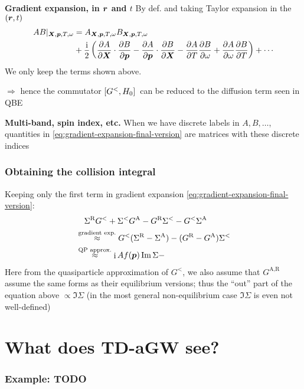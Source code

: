 \documentclass[t]{beamer}
\DeclareMathOperator{\ii}{i}
\begin{document}
\begin{frame}[allowframebreaks]
\textbf{Gradient expansion, in $\vb*{r}$ and $t$} 
By def. and taking Taylor expansion in the $(\vb*{r}, t)$
\begin{equation}
    \begin{aligned}
        AB|_{\vb*{X}, \vb*{p}, T, \omega} &= A_{\vb*{X}, \vb*{p}, T, \omega} B_{\vb*{X}, \vb*{p}, T, \omega} \\
        &+ \frac{\ii}{2} \left(
            \pdv{A}{\vb*{X}} \cdot \pdv{B}{\vb*{p}}
            - \pdv{A}{\vb*{p}} \cdot \pdv{B}{\vb*{X}}
            - \pdv{A}{T} \pdv{B}{\omega}
            + \pdv{A}{\omega} \pdv{B}{T}
        \right) + \cdots
    \end{aligned}
    \label{eq:gradient-expansion-final-version}
\end{equation}
We only keep the terms shown above. 

$\Rightarrow$ hence the commutator $\comm*{G^<}{H_0}$ can be reduced to the diffusion term seen in QBE

\vspace{0.25cm}

\textbf{Multi-band, spin index, etc.} When we have discrete labels in $A, B, \dots$,
quantities in \eqref{eq:gradient-expansion-final-version} 
are matrices with these discrete indices

\end{frame}

\begin{frame}
\frametitle{Obtaining the collision integral}

Keeping only the first term in gradient expansion \eqref{eq:gradient-expansion-final-version}:
\begin{equation}
    \begin{aligned}
        &\quad \Sigma^{\text{R}} G^< + \Sigma^< G^{\text{A}} - G^{\text{R}} \Sigma^< - G^< \Sigma^{\text{A}}\\
        &\stackrel{\text{gradient exp.}}{\approx} G^<(\Sigma^{\text{R}} - \Sigma^{\text{A}}) 
        - (G^{\text{R}} - G^{\text{A}}) \Sigma^< \\
        &\stackrel{\text{QP approx.}}{\approx} \ii A f (\vb*{p}) \Im \Sigma
        - 
    \end{aligned}
\end{equation}    
Here from the quasiparticle approximation of $G^<$,
we also assume that $G^{\text{A}, \text{R}}$ assume 
the same forms as their equilibrium versions;
thus the ``out'' part of the equation above $\propto \Im \Sigma$
(in the most general non-equilibrium case $\Im \Sigma$ is even not well-defined)


\end{frame}

\section{What does TD-aGW see?}

\begin{frame}
    \frametitle{Example: TODO}

    

\end{frame}
\end{document}
